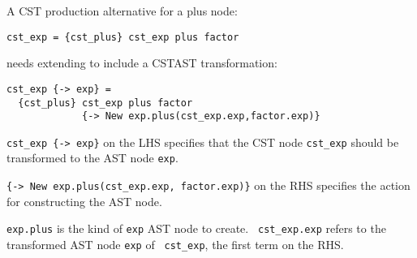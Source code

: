 \begin{slide*}
A CST production alternative for a plus node:

\begin{scriptsize}
\begin{verbatim}
cst_exp = {cst_plus} cst_exp plus factor
\end{verbatim}
\end{scriptsize}

needs extending to include a CST\RA{}AST transformation:

\begin{scriptsize}
\begin{verbatim}
cst_exp {-> exp} =
  {cst_plus} cst_exp plus factor 
             {-> New exp.plus(cst_exp.exp,factor.exp)}
\end{verbatim}
\end{scriptsize}

{\tt cst\_exp \{-> exp\}} on the LHS specifies that the CST node
{\tt cst\_exp} should be transformed to the AST node {\tt exp}.

{\tt \{-> New exp.plus(cst\_exp.exp, factor.exp)\}} on the RHS
specifies the action for constructing the AST node.

{\tt exp.plus} is the kind of {\tt exp} AST node to create.  {\tt
  cst\_exp.exp} refers to the transformed AST node {\tt exp} of {\tt
  cst\_exp}, the first term on the RHS.

 \vfil
\end{slide*}

